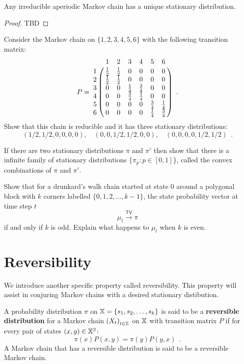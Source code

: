 {\begin{prop}\label{P:UniqueStationaryDistrn}
Any irreducible aperiodic Markov chain has a unique stationary distribution.
\begin{proof}
TBD
\end{proof}
\end{prop}


\begin{exercise}\label{EXR:SixStatesWith3Blockof2}
Consider the Markov chain on $\{1,2,3,4,5,6\}$ with the following transition matrix:
\[
P = 
\bordermatrix{ ~ & 1 & 2 & 3 &  4 & 5 & 6 \cr 
1 & \frac{1}{2} & \frac{1}{2} & 0 & 0 & 0 & 0 \cr
2 & \frac{1}{2} & \frac{1}{2} & 0 & 0 & 0 & 0 \cr
3 & 0 & 0 &  \frac{1}{4} & \frac{3}{4} & 0 & 0  \cr
4 & 0 & 0 &  \frac{3}{4} & \frac{1}{4} & 0 & 0  \cr
5 & 0 & 0 &  0 & 0 & \frac{3}{4} & \frac{1}{4}  \cr
6 & 0 & 0 &  0 & 0 & \frac{1}{4} & \frac{3}{4}  } \enspace .
\]
Show that this chain is reducible and it has three stationary distributions:
\[
(1/2,1/2,0,0,0,0), \quad (0,0,1/2,1/2,0,0), \quad (0,0,0,0,1/2,1/2) \enspace .
\]
\end{exercise}

\begin{exercise}\label{EXR:ConvexCombof2StationaryDistrns}
If there are two stationary distributions $\pi$ and $\pi'$ then show that there is a infinite family of stationary distributions $\{\pi_p : p \in [0,1] \}$, called the convex combinations of $\pi$ and $\pi'$.
\end{exercise}

\begin{exercise}\label{EXR:ConvergengeinTVFailsforPeriodicDrunkardWalk}
Show that for a drunkard's walk chain started at state $0$ around a polygonal block with $k$ corners labelled $\{0,1,2,\ldots,k-1\}$, the state probability vector at time step $t$
\[
\mu_t \overset{\mathsf{TV}}{\longrightarrow} \pi   
\]
if and only if $k$ is odd.  Explain what happens to $\mu_t$ when $k$ is even.
\end{exercise}

\section{Reversibility}

We introduce another specific property called reversibility.  
This property will assist in conjuring Markov chains with a desired stationary distibution.

\begin{definition}[Reversible]\label{D:Reversible}
A probability distribution $\pi$ on $\mathbb{X} = \{s_1,s_2,\ldots,s_k\}$ is said to be a {\bf reversible distribution} for a Markov chain $\left(X_t\right)_{t\in \mathbb{Z}}$ on $\mathbb{X}$ with transition matrix $P$ if for every pair of states $(x,y) \in \mathbb{X}^2$:
\begin{equation}\label{E:ReversibilityCondition}
\pi(x) P(x,y) = \pi(y) P(y,x) \enspace .
\end{equation}
A Markov chain that has a reversible distribution is said to be a reversible Markov chain.
\end{definition}

}
